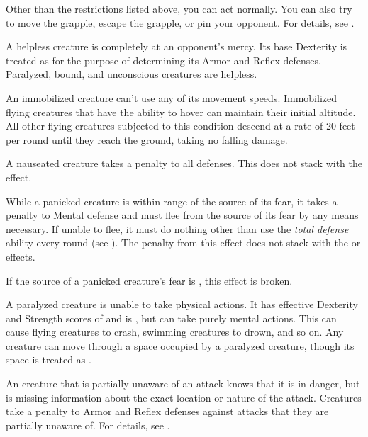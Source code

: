 Other than the restrictions listed above, you can act normally. You can also try to move the grapple, escape the grapple, or pin your opponent. For details, see .

 A helpless creature is completely at an opponent's mercy.
Its base Dexterity is treated as  for the purpose of determining its Armor and Reflex defenses.
Paralyzed, bound, and unconscious creatures are helpless.

 An immobilized creature can't use any of its movement speeds.
Immobilized flying creatures that have the ability to hover can maintain their initial altitude.
All other flying creatures subjected to this condition descend at a rate of 20 feet per round until they reach the ground, taking no falling damage.

 A nauseated creature takes a  penalty to all defenses.
This does not stack with the  effect.

 While a panicked creature is within \rngmed range of the source of its fear, it takes a  penalty to Mental defense and must flee from the source of its fear by any means necessary.
If unable to flee, it must do nothing other than use the \textit{total defense} ability every round (see ).
The penalty from this effect does not stack with the  or  effects.

If the source of a panicked creature's fear is , this effect is broken.

 A paralyzed creature is unable to take physical actions. It has effective Dexterity and Strength scores of  and is \helpless, but can take purely mental actions. This can cause flying creatures to crash, swimming creatures to drown, and so on. Any creature can move through a space occupied by a paralyzed creature, though its space is treated as .

 An creature that is partially unaware of an attack knows that it is in danger, but is missing information about the exact location or nature of the attack.
Creatures take a  penalty to Armor and Reflex defenses against attacks that they are partially unaware of.
For details, see .

